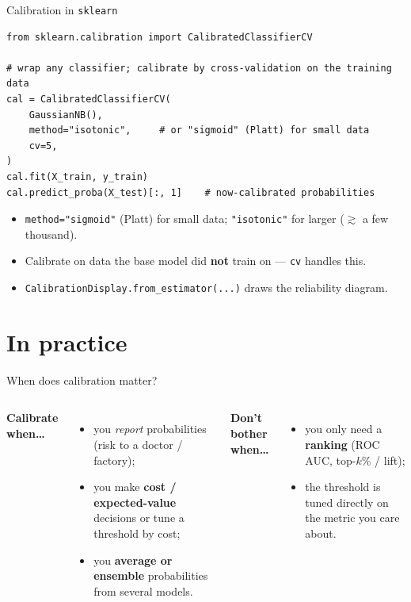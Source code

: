 \documentclass[aspectratio=169]{beamer}
\begin{document}
\begin{frame}[fragile]{Calibration in \texttt{sklearn}}
\begin{lstlisting}
from sklearn.calibration import CalibratedClassifierCV

# wrap any classifier; calibrate by cross-validation on the training data
cal = CalibratedClassifierCV(
    GaussianNB(),
    method="isotonic",     # or "sigmoid" (Platt) for small data
    cv=5,
)
cal.fit(X_train, y_train)
cal.predict_proba(X_test)[:, 1]    # now-calibrated probabilities
\end{lstlisting}
  \vskip 2pt
  \begin{itemize}\small
    \item \texttt{method="sigmoid"} (Platt) for small data; \texttt{"isotonic"} for larger
      ($\gtrsim$ a few thousand).
    \item Calibrate on data the base model did \textbf{not} train on --- \texttt{cv} handles this.
    \item \texttt{CalibrationDisplay.from\_estimator(...)} draws the reliability diagram.
  \end{itemize}
\end{frame}

\section{In practice}

\begin{frame}{When does calibration matter?}
  \begin{columns}[T]
    \textbf{Calibrate when\dots}
    \begin{itemize}\small
      \item you \emph{report} probabilities (risk to a doctor / factory);
      \item you make \textbf{cost / expected-value} decisions or tune a threshold by cost;
      \item you \textbf{average or ensemble} probabilities from several models.
    \end{itemize}
    \textbf{Don't bother when\dots}
    \begin{itemize}\small
      \item you only need a \textbf{ranking} (ROC AUC, top-$k$\% / lift);
      \item the threshold is tuned directly on the metric you care about.
    \end{itemize}
  \end{columns}
  \vfill
\end{frame}
\end{document}

